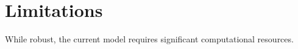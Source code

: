 \section{Limitations}
While robust, the current model requires significant computational resources.
